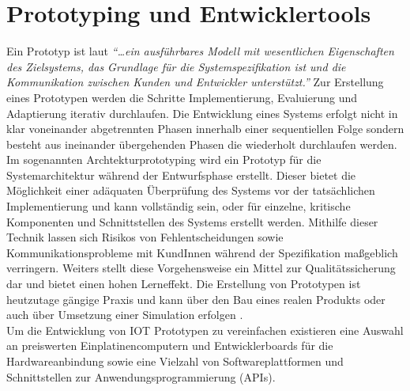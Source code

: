 \documentclass[BMR,Bachelor,ngerman]{twbook}%
\begin{document}
\section{Prototyping und Entwicklertools}
Ein Prototyp ist laut  \emph{``\dots ein ausführbares Modell mit wesentlichen Eigenschaften des Zielsystems, das Grundlage für die Systemspezifikation ist und die Kommunikation zwischen Kunden und Entwickler unterstützt.''} Zur Erstellung eines Prototypen werden die Schritte Implementierung, Evaluierung und Adaptierung iterativ durchlaufen. Die Entwicklung eines Systems erfolgt nicht in klar voneinander abgetrennten Phasen innerhalb einer sequentiellen Folge sondern besteht aus ineinander übergehenden Phasen die wiederholt durchlaufen werden. Im sogenannten Archtekturprototyping wird ein Prototyp für die Systemarchitektur während der Entwurfsphase erstellt. Dieser bietet die Möglichkeit einer adäquaten Überprüfung des Systems vor der tatsächlichen Implementierung und kann vollständig sein, oder für einzelne, kritische Komponenten und Schnittstellen des Systems erstellt werden. Mithilfe dieser Technik lassen sich Risikos von Fehlentscheidungen sowie Kommunikationsprobleme mit KundInnen während der Spezifikation maßgeblich verringern. Weiters stellt diese Vorgehensweise ein Mittel zur Qualitätssicherung dar und bietet einen hohen Lerneffekt. Die Erstellung von Prototypen ist heutzutage gängige Praxis und kann über den Bau eines realen Produkts oder auch über Umsetzung einer Simulation erfolgen \cite{pomberger1992methoden}.
%
\\\newline
Um die Entwicklung von \ac{IOT} Prototypen zu vereinfachen existieren eine Auswahl an preiswerten Einplatinencomputern und Entwicklerboards für die Hardwareanbindung sowie eine Vielzahl von Softwareplattformen und Schnittstellen zur Anwendungsprogrammierung (\acp{API}).
\end{document}
